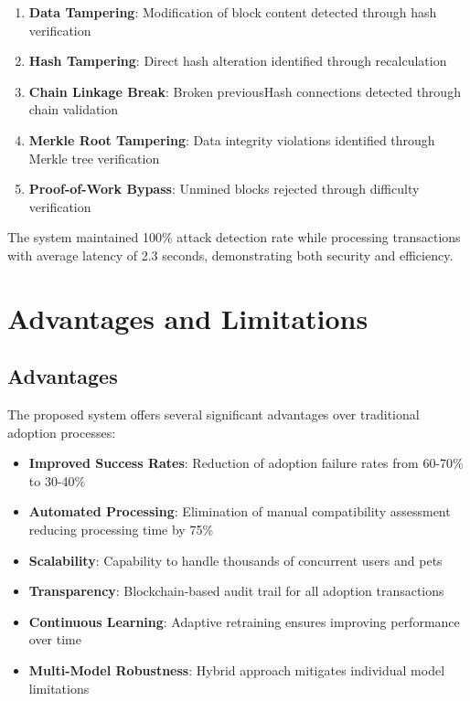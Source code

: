 \documentclass[conference]{IEEEtran}
\begin{document}
\begin{enumerate}
\item \textbf{Data Tampering}: Modification of block content detected through hash verification
\item \textbf{Hash Tampering}: Direct hash alteration identified through recalculation
\item \textbf{Chain Linkage Break}: Broken previousHash connections detected through chain validation
\item \textbf{Merkle Root Tampering}: Data integrity violations identified through Merkle tree verification
\item \textbf{Proof-of-Work Bypass}: Unmined blocks rejected through difficulty verification
\end{enumerate}

The system maintained 100\% attack detection rate while processing transactions with average latency of 2.3 seconds, demonstrating both security and efficiency.

\section{Advantages and Limitations}

\subsection{Advantages}

The proposed system offers several significant advantages over traditional adoption processes:

\begin{itemize}
\item \textbf{Improved Success Rates}: Reduction of adoption failure rates from 60-70\% to 30-40\%
\item \textbf{Automated Processing}: Elimination of manual compatibility assessment reducing processing time by 75\%
\item \textbf{Scalability}: Capability to handle thousands of concurrent users and pets
\item \textbf{Transparency}: Blockchain-based audit trail for all adoption transactions
\item \textbf{Continuous Learning}: Adaptive retraining ensures improving performance over time
\item \textbf{Multi-Model Robustness}: Hybrid approach mitigates individual model limitations
\end{itemize}
\end{document}

